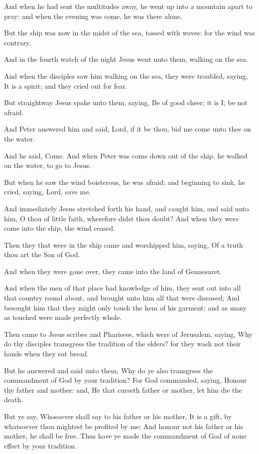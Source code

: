 \Verse And when he had sent the multitudes away, he went up into a mountain apart to pray: and when the evening was come, he was there alone.

\Verse But the ship was now in the midst of the sea, tossed with waves: for the wind was contrary.

\Verse And in the fourth watch of the night Jesus went unto them, walking on the sea.

\Verse And when the disciples saw him walking on the sea, they were troubled, saying, It is a spirit; and they cried out for fear.

\Verse But straightway Jesus spake unto them, saying, Be of good cheer; it is I; be not afraid.

\Verse And Peter answered him and said, Lord, if it be thou, bid me come unto thee on the water.

\Verse And he said, Come. And when Peter was come down out of the ship, he walked on the water, to go to Jesus.

\Verse But when he saw the wind boisterous, he was afraid; and beginning to sink, he cried, saying, Lord, save me.

\Verse And immediately Jesus stretched forth his hand, and caught him, and said unto him, O thou of little faith, wherefore didst thou doubt?  \Verse And when they were come into the ship, the wind ceased.

\Verse Then they that were in the ship came and worshipped him, saying, Of a truth thou art the Son of God.

\Verse And when they were gone over, they came into the land of Gennesaret.

\Verse And when the men of that place had knowledge of him, they sent out into all that country round about, and brought unto him all that were diseased; \Verse And besought him that they might only touch the hem of his garment: and as many as touched were made perfectly whole.


\Chapter
\Verse Then came to Jesus scribes and Pharisees, which were of Jerusalem, saying, \Verse Why do thy disciples transgress the tradition of the elders? for they wash not their hands when they eat bread.

\Verse But he answered and said unto them, Why do ye also transgress the commandment of God by your tradition?  \Verse For God commanded, saying, Honour thy father and mother: and, He that curseth father or mother, let him die the death.

\Verse But ye say, Whosoever shall say to his father or his mother, It is a gift, by whatsoever thou mightest be profited by me; \Verse And honour not his father or his mother, he shall be free. Thus have ye made the commandment of God of none effect by your tradition.

